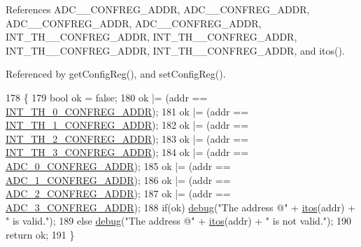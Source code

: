 References A\+D\+C\+\_\+\_\+\+C\+O\+N\+F\+R\+E\+G\+\_\+\+A\+D\+DR, A\+D\+C\+\_\+\_\+\+C\+O\+N\+F\+R\+E\+G\+\_\+\+A\+D\+DR, A\+D\+C\+\_\+\_\+\+C\+O\+N\+F\+R\+E\+G\+\_\+\+A\+D\+DR, A\+D\+C\+\_\+\_\+\+C\+O\+N\+F\+R\+E\+G\+\_\+\+A\+D\+DR, I\+N\+T\+\_\+\+T\+H\+\_\+\_\+\+C\+O\+N\+F\+R\+E\+G\+\_\+\+A\+D\+DR, I\+N\+T\+\_\+\+T\+H\+\_\+\_\+\+C\+O\+N\+F\+R\+E\+G\+\_\+\+A\+D\+DR, I\+N\+T\+\_\+\+T\+H\+\_\+\_\+\+C\+O\+N\+F\+R\+E\+G\+\_\+\+A\+D\+DR, I\+N\+T\+\_\+\+T\+H\+\_\+\_\+\+C\+O\+N\+F\+R\+E\+G\+\_\+\+A\+D\+DR, and itos().



Referenced by get\+Config\+Reg(), and set\+Config\+Reg().


\begin{DoxyCode}
178     \{
179          \textcolor{keywordtype}{bool} ok = \textcolor{keyword}{false};
180          ok |= (addr == \hyperlink{LSDelayChipV1_8h_a27e55e95b788d2cc312a439198c26971}{INT\_TH\_0\_CONFREG\_ADDR}); 
181          ok |= (addr == \hyperlink{LSDelayChipV1_8h_a771c79d3381641a3bc709f4a69efcc28}{INT\_TH\_1\_CONFREG\_ADDR});
182          ok |= (addr == \hyperlink{LSDelayChipV1_8h_a0a4946654da8e2065cc0b461f99d9bc8}{INT\_TH\_2\_CONFREG\_ADDR});
183          ok |= (addr == \hyperlink{LSDelayChipV1_8h_af8cc01f53a4a2d46901b9f32372ab6ea}{INT\_TH\_3\_CONFREG\_ADDR});     
184          ok |= (addr == \hyperlink{LSDelayChipV1_8h_ad1c6f1ce476a54a95469cd130dffa074}{ADC\_0\_CONFREG\_ADDR}); 
185          ok |= (addr == \hyperlink{LSDelayChipV1_8h_a83aa641dd89900461bdc2ed428f2bce9}{ADC\_1\_CONFREG\_ADDR});
186          ok |= (addr == \hyperlink{LSDelayChipV1_8h_abd577ee5c75174c74fc6886c1eaad80a}{ADC\_2\_CONFREG\_ADDR});
187          ok |= (addr == \hyperlink{LSDelayChipV1_8h_a19e4f86f88864d8c249bd537ef628f92}{ADC\_3\_CONFREG\_ADDR});
188          \textcolor{keywordflow}{if}(ok) \hyperlink{classObject_aac010553f022165573714b7014a15f0d}{debug}(\textcolor{stringliteral}{"The address @"} + \hyperlink{Tools_8h_af330027dbdafb9a30768b3613c553e60}{itos}(addr) + \textcolor{stringliteral}{" is valid."});
189          \textcolor{keywordflow}{else}   \hyperlink{classObject_aac010553f022165573714b7014a15f0d}{debug}(\textcolor{stringliteral}{"The address @"} + \hyperlink{Tools_8h_af330027dbdafb9a30768b3613c553e60}{itos}(addr) + \textcolor{stringliteral}{" is not valid."});
190          \textcolor{keywordflow}{return} ok;           
191     \}
\end{DoxyCode}
\mbox{\label{classLSDelayChipV1_a5083f29a93d38258d9de00dd5a89af99}} 
